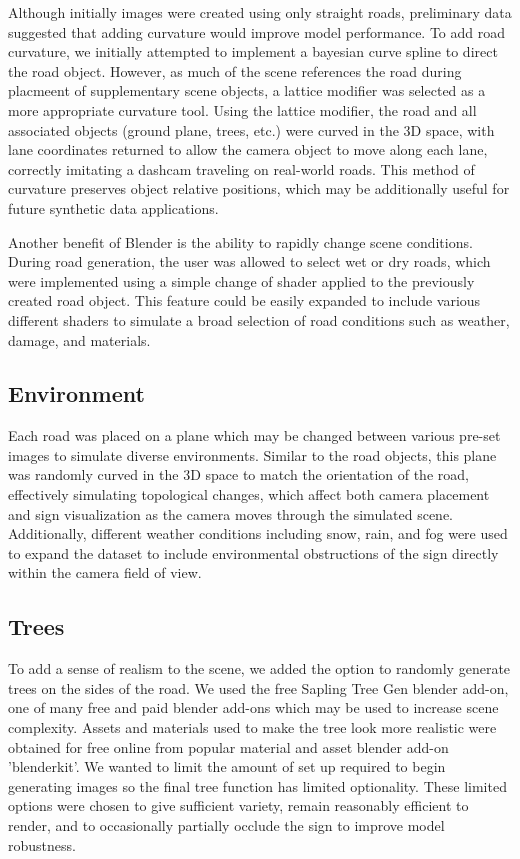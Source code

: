 \documentclass[journal]{IEEEtran}
\begin{document}
Although initially images were created using only straight roads, preliminary data suggested that adding curvature would improve model performance. To add road curvature, we initially attempted to implement a bayesian curve spline to direct the road object. However, as much of the scene references the road during placmeent of supplementary scene objects, a lattice modifier was selected as a more appropriate curvature tool. Using the lattice modifier, the road and all associated objects (ground plane, trees, etc.) were curved in the 3D space, with lane coordinates returned to allow the camera object to move along each lane, correctly imitating a dashcam traveling on real-world roads. This method of curvature preserves object relative positions, which may be additionally useful for future synthetic data applications.


Another benefit of Blender is the ability to rapidly change scene conditions. During road generation, the user was allowed to select wet or dry roads, which were implemented using a simple change of shader applied to the previously created road object. This feature could be easily expanded to include various different shaders to simulate a broad selection of road conditions such as weather, damage, and materials. 

\subsection{Environment}
Each road was placed on a plane which may be changed between various pre-set images to simulate diverse environments. Similar to the road objects, this plane was randomly curved in the 3D space to match the orientation of the road, effectively simulating topological changes, which affect both camera placement and sign visualization as the camera moves through the simulated scene. Additionally, different weather conditions including snow, rain, and fog were used to expand the dataset to include environmental obstructions of the sign directly within the camera field of view.  

\subsection{Trees}
To add a sense of realism to the scene, we added the option to randomly generate trees on the sides of the road. We used the free Sapling Tree Gen blender add-on, one of many free and paid blender add-ons which may be used to increase scene complexity\cite{sapling_blender_addon}. Assets and materials used to make the tree look more realistic were obtained for free online from popular material and asset blender add-on 'blenderkit'. We wanted to limit the amount of set up required to begin generating images so the final tree function has limited optionality. These limited options were chosen to give sufficient variety, remain reasonably efficient to render, and to occasionally partially occlude the sign to improve model robustness. 
\end{document}
